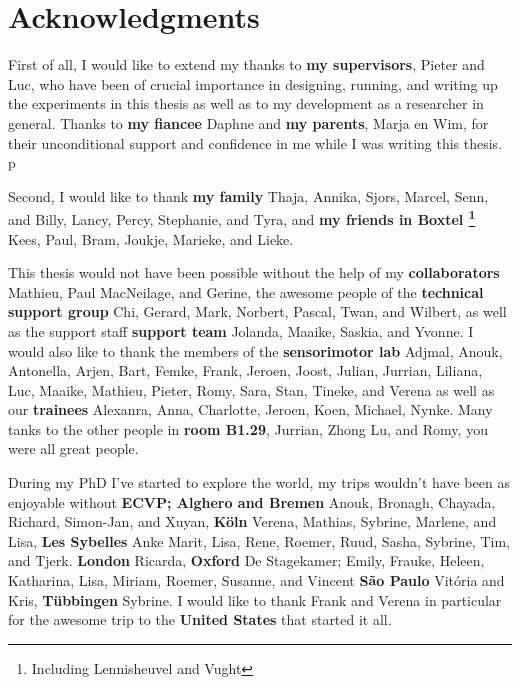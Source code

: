 \clearpage
\pagestyle{empty}

\chapter*{Acknowledgments}
{}

First of all, I would like to extend my thanks to \textbf{my supervisors}, Pieter and Luc, who have been of crucial importance in designing, running, and writing up the experiments in this thesis as well as to my development as a researcher in general. Thanks to \textbf{my fiancee} Daphne and \textbf{my parents}, Marja en Wim, for their unconditional support and confidence in me while I was writing this thesis. p

Second, I would like to thank \textbf{my family} Thaja, Annika, Sjors, Marcel, Senn, and Billy, Lancy, Percy, Stephanie, and Tyra, and \textbf{my friends in Boxtel \footnote{Including Lennisheuvel and Vught}} Kees, Paul, Bram, Joukje, Marieke, and Lieke.


This thesis would not have been possible without the help of 
my \textbf{collaborators} Mathieu, Paul MacNeilage, and Gerine,
the awesome people of the
\textbf{technical support group} Chi, Gerard, Mark, Norbert, Pascal, Twan, and Wilbert,
as well as the support staff
\textbf{support team} Jolanda, Maaike, Saskia, and Yvonne.
I would also like to thank the members of the 
\textbf{sensorimotor lab} Adjmal, Anouk, Antonella, Arjen, Bart, Femke, Frank, Jeroen, Joost, Julian, Jurrian, Liliana, Luc, Maaike, Mathieu, Pieter, Romy, Sara, Stan, Tineke, and Verena 
as well as our 
\textbf{trainees} Alexanra, Anna, Charlotte, Jeroen, Koen, Michael, Nynke.
Many tanks to the other people in \textbf{room B1.29}, Jurrian, Zhong Lu, and Romy, you were all great people.


During my PhD I've started to explore the world, my trips wouldn't have been as enjoyable without 
\textbf{ECVP; Alghero and Bremen} Anouk, Bronagh, Chayada, Richard, Simon-Jan, and Xuyan,
\textbf{K\"oln} Verena, Mathias, Sybrine, Marlene, and Lisa,
\textbf{Les Sybelles} Anke Marit, Lisa, Rene, Roemer, Ruud, Sasha, Sybrine, Tim, and Tjerk.
\textbf{London} Ricarda,
\textbf{Oxford} De Stagekamer; Emily, Frauke, Heleen, Katharina, Lisa, Miriam, Roemer, Susanne, and Vincent
\textbf{S\~ao Paulo} Vit\'oria and Kris,
\textbf{T\"ubbingen} Sybrine.
I would like to thank Frank and Verena in particular for the awesome trip to the \textbf{United States} that started it all.


